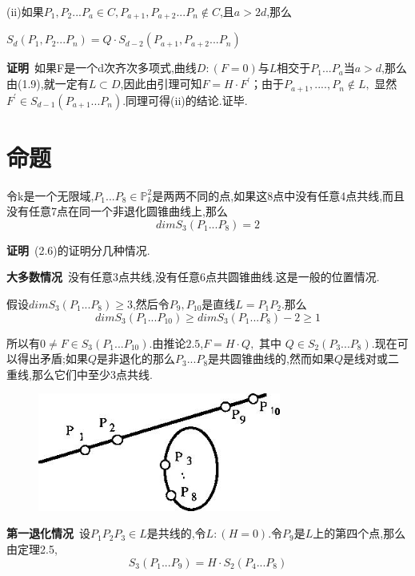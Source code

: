 \documentclass[UTF8]{book}
\begin{document}
		(ii)如果$P_{1},P_{2} ... P_{a} \in C, P_{a+1},P_{a+2} ... P_{n} \notin C$,且$ a>2d $,那么
		
		
		\quad $S_{d}(P_{1},P_{2} ... P_{n} )=Q· S_{d-2}(P_{a+1},P_{a+2} ... P_{n})$
		
		
		\textbf{证明}\ 如果F是一个d次齐次多项式,曲线$ D:(F=0) $与$ L $相交于$P_{1}...P_{a}$当$ a>d $,那么由(1.9),就一定有$L\subset D$,因此由引理可知$ F=H·F^{\prime} $；由于$P_{a+1} ,...., P_{n} \notin L,$ 显然 $F^{\prime} \in S_{d-1}(P_{a+1} ... P_{n})$.同理可得(ii)的结论.证毕.
	\section{命题}
		令k是一个无限域,$P_{1} ... P_{8} \in \mathbb{P}^{2}_{k}$是两两不同的点,如果这8点中没有任意4点共线,而且没有任意7点在同一个非退化圆锥曲线上,那么
		\begin{equation*}
		dimS_{3}(P_{1}...P_{8})=2
		\end{equation*}
		
		
		\textbf{证明}\ (2.6)的证明分几种情况.
		
		
		\textbf{大多数情况}\ 没有任意3点共线,没有任意6点共圆锥曲线.这是一般的位置情况.
		
		
		假设$dim S_{3}(P_{1}...P_{8})\ge 3$,然后令$P_{9},P_{10}$是直线$L=P_{1} P_{2}$.那么
		\begin{equation*}
		dim S_{3}(P_{1}...P_{10})\ge dim S_{3}(P_{1} ... P_{8} )-2 \ge 1
		\end{equation*}
		
		
		所以有$0 \ne F \in S_{3} (P_{1} ... P_{10} )$.由推论$ 2.5 $,$F=H·Q,$ 其中 $Q \in S_{2} (P_{3} ... P_{8} )$.现在可以得出矛盾;如果$ Q $是非退化的那么$P_{3} ... P_{8}$是共圆锥曲线的,然而如果$ Q $是线对或二重线,那么它们中至少3点共线.
		\begin{figure}[H]
		  \centering
		  \includegraphics[width=8cm]{32.jpg}
		\end{figure}
	
	
		\textbf{第一退化情况}\ 设$P_{1} P_{2} P_{3} \in L$是共线的,令$ L:(H=0) $.令$P_{9}$是$ L $上的第四个点,那么由定理2.5,
		\begin{equation*}
		S_{3}(P_{1} ... P_{9} )=H· S_{2}(P_{4} ... P_{8} )
		\end{equation*}
		
\end{document}
